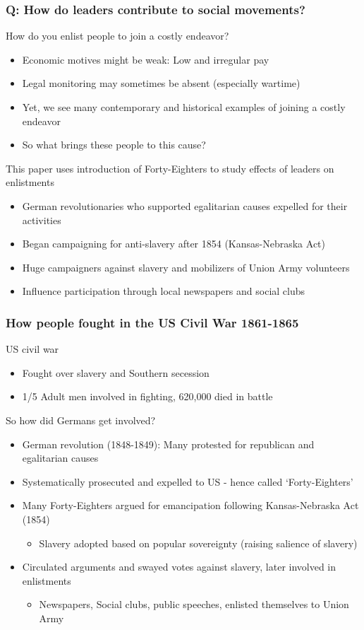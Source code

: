 \documentclass[aspectratio=169]{beamer}
\begin{document}
\begin{frame}
\frametitle{Q: How do leaders contribute to social movements?} 
How do you enlist people to join a costly endeavor?
\begin{itemize}\setlength\itemsep{3pt}
\item Economic motives might be weak: Low and irregular pay
\item Legal monitoring may sometimes be absent (especially wartime)
\item Yet, we see many contemporary and historical examples of joining a costly endeavor
\item So what brings these people to this cause?
\end{itemize}\medskip
This paper uses introduction of Forty-Eighters to study effects of leaders on enlistments
\begin{itemize}\setlength\itemsep{3pt}
\item German revolutionaries who supported egalitarian causes expelled for their activities
\item Began campaigning for anti-slavery after 1854 (Kansas-Nebraska Act)
\item Huge campaigners against slavery and mobilizers of Union Army volunteers
\item Influence participation through local newspapers and social clubs
\end{itemize}\medskip
\end{frame}

\begin{frame}
\frametitle{How people fought in the US Civil War 1861-1865} 
US civil war
\begin{itemize}\setlength\itemsep{3pt}
 \item Fought over slavery and Southern secession 
\item 1/5 Adult men involved in fighting, 620,000 died in battle
\end{itemize}\medskip
So how did Germans get involved?
\begin{itemize}\setlength\itemsep{3pt}
\item German revolution (1848-1849): Many protested for republican and egalitarian causes
\item Systematically prosecuted and expelled to US - hence called `Forty-Eighters'
\item Many Forty-Eighters argued for emancipation following Kansas-Nebraska Act (1854)
\begin{itemize}
\item Slavery adopted based on popular sovereignty (raising salience of slavery)
\end{itemize}
\item Circulated arguments and swayed votes against slavery, later involved in enlistments
\begin{itemize}
\item Newspapers, Social clubs, public speeches, enlisted themselves to Union Army
\end{itemize}
\end{itemize}\medskip
\end{frame}
\end{document}
